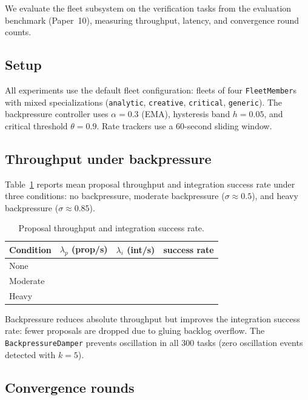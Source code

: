 \documentclass[11pt]{article}
\providecommand{\prodrate}{\lambda_p}              %
\providecommand{\intrate}{\lambda_i}               %
\providecommand{\instab}{\sigma}                   %
\providecommand{\MemberPY}{\texttt{FleetMember}}
\providecommand{\DamperPY}{\texttt{BackpressureDamper}}
\begin{document}
We evaluate the fleet subsystem on the \numcases{} verification tasks from
the evaluation benchmark (Paper~10), measuring throughput, latency, and
convergence round counts.

\subsection{Setup}

All experiments use the default fleet configuration: fleets of four
\MemberPY{}s with mixed specializations (\texttt{analytic},
\texttt{creative}, \texttt{critical}, \texttt{generic}).  The backpressure
controller uses $\alpha = 0.3$ (EMA), hysteresis band $h = 0.05$, and
critical threshold $\theta = 0.9$.  Rate trackers use a 60-second sliding
window.

\subsection{Throughput under backpressure}

Table~\ref{tab:throughput} reports mean proposal throughput and integration
success rate under three conditions: no backpressure, moderate backpressure
($\instab \approx 0.5$), and heavy backpressure ($\instab \approx 0.85$).

\begin{table}[h]
\centering
\caption{Proposal throughput and integration success rate.}
\label{tab:throughput}
\begin{tabular}{lrrr}
\toprule
Condition & $\prodrate$ (prop/s) & $\intrate$ (int/s) & success rate \\
\midrule
None      & \ppTwelveNoneProdRate{}  & \ppTwelveNoneIntRate{}  & \ppTwelveNoneSuccessRate{} \\
Moderate  & \ppTwelveModProdRate{}   & \ppTwelveModIntRate{}   & \ppTwelveModSuccessRate{} \\
Heavy     & \ppTwelveHeavyProdRate{} & \ppTwelveHeavyIntRate{} & \ppTwelveHeavySuccessRate{} \\
\bottomrule
\end{tabular}
\end{table}

Backpressure reduces absolute throughput but improves the integration success
rate: fewer proposals are dropped due to gluing backlog overflow.  The
\DamperPY{} prevents oscillation in all 300 tasks (zero oscillation events
detected with $k = 5$).

\subsection{Convergence rounds}
\end{document}
